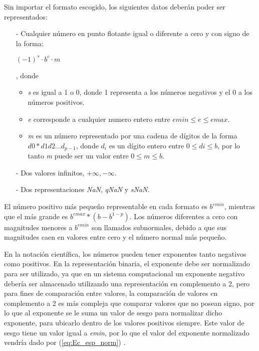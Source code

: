 Sin importar el formato escogido, los siguientes datos deberán poder ser representados:

\begin{itemize}
	\item[-]	Cualquier número en punto flotante igual o diferente a cero y con signo de la forma:
	\begin{center} $(-1)^{s} \cdot b^{e} \cdot m $ \end{center}, donde
	\begin{itemize}
		\item	\textit{s} es igual a 1 o 0, donde 1 representa a los números negativos y el 0 a los números positivos.
		\item	\textit{e} corresponde a cualquier numero entero entre $emin \leq e \leq emax$.
		\item	\textit{m} es un número representado por una cadena de dígitos de la forma $ d0*d1d2...d_{p-1} $, donde $ d_{i} $ es un dígito entero entre $ 0 \leq di \leq b $, por lo tanto \textit{m} puede ser un valor  entre $ 0 \leq m \leq b $.
		
	\end{itemize}
	\item[-]	Dos valores infinitos, $ +\infty,-\infty $.
	\item[-]	Dos representaciones \textit{NaN}, \textit{qNaN} y \textit{sNaN}.
\end{itemize}

El número positivo más pequeño representable en cada formato es $b^{emin}$, mientras que el más grande es $b^{emax}*(b-b^{1-p})$. Los números diferentes a cero con magnitudes menores a $b^{emin}$ son llamados subnormales, debido a que sus magnitudes caen en valores entre cero y el número normal más pequeño.

En la notación científica, los números pueden tener exponentes tanto negativos como positivos. En la representación binaria, el exponente debe ser  normalizado para ser utilizado, ya que en un sistema computacional un exponente negativo debería ser almacenado utilizando una representación en complemento a 2, pero para fines de comparación entre valores, la comparación de valores en complemento a 2 es más compleja que comparar valores que no posean signo, por lo que al exponente se le suma un valor de sesgo para normalizar dicho exponente, para ubicarlo dentro de los valores positivos siempre. Este valor de sesgo tiene un valor igual a \textit{emin}, por lo que el valor del exponente normalizado vendría dado por (\ref{eq:Ec_esp_norm})  \cite{Tesis_Diego}.

